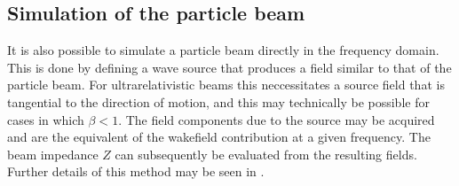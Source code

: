 \subsection{Simulation of the particle beam}

It is also possible to simulate a particle beam directly in the frequency domain. This is done by defining a wave source that produces a field similar to that of the particle beam. For ultrarelativistic beams this neccessitates a source field that is tangential to the direction of motion, and this may technically be possible for cases in which $\beta < 1$. The field components due to the source may be acquired and are the equivalent of the wakefield contribution at a given frequency. The beam impedance $Z$ can subsequently be evaluated from the resulting fields. Further details of this method may be seen in \cite{Kononenko:TransBeamLoading}.

